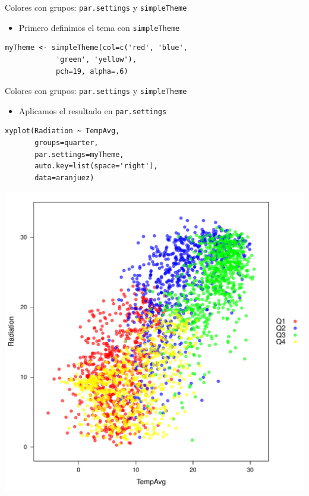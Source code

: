 \documentclass[xcolor={usenames,svgnames,dvipsnames}]{beamer}
\begin{document}
\begin{frame}[fragile,label=sec-2-1-12]{Colores con grupos: \texttt{par.settings} y \texttt{simpleTheme}}
 \begin{itemize}
\item Primero definimos el tema con \texttt{simpleTheme}
\end{itemize}
\lstset{language=R,numbers=none}
\begin{lstlisting}
myTheme <- simpleTheme(col=c('red', 'blue',
			'green', 'yellow'),
			pch=19, alpha=.6)
\end{lstlisting}
\end{frame}
\begin{frame}[fragile,label=sec-2-1-13]{Colores con grupos: \texttt{par.settings} y \texttt{simpleTheme}}
 \begin{itemize}
\item Aplicamos el resultado en \texttt{par.settings}
\end{itemize}
\lstset{language=R,numbers=none}
\begin{lstlisting}
xyplot(Radiation ~ TempAvg,
       groups=quarter,
       par.settings=myTheme,
       auto.key=list(space='right'),
       data=aranjuez)
\end{lstlisting}

\includegraphics[width=.9\linewidth]{figs/myTheme.pdf}
\end{frame}
\end{document}
